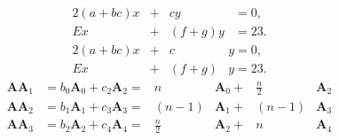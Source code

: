 \documentclass[reqno]{amsart}
\newcommand\Abf{\ensuremath{\mathbf A}}
\begin{document}
\begin{alignat*}{2}
    (a+bc)x &+{} &cy &= 0,\\
    Ex &+{} &(f+g)y &= 23.
\end{alignat*}
\begin{alignat*}{2}
    (a+bc)x &+{} &c&y = 0,\\
    Ex &+{} &(f+g)&y = 23.
\end{alignat*}
\begin{subequations}
    \begin{alignat}{3}
        \Abf\Abf_1 &= b_0\Abf_0 + c_2\Abf_2 ={} &n&\Abf_0 +{} &\frac n2&\Abf_2\\
        \Abf\Abf_2 &= b_1\Abf_1 + c_3\Abf_3 ={} &(n-1)&\Abf_1 +{} &(n-1)&\Abf_3\\
        \Abf\Abf_3 &= b_2\Abf_2 + c_4\Abf_4 ={} &\frac n2&\Abf_2 +{} &n&\Abf_4
    \end{alignat}
\end{subequations}
\end{document}
